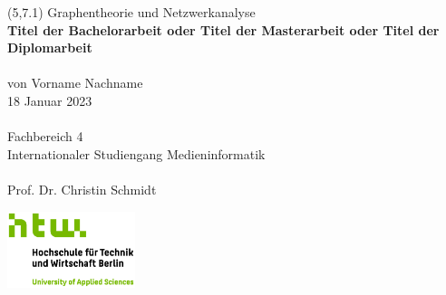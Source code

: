 \begin{titlepage}

\begingroup
\begin{textblock}{6}(5,7.1)
\setlength{\parindent}{0pt}
\fontsize{10pt}{1.1em}\selectfont
Graphentheorie und Netzwerkanalyse
\vspace{0.1cm}
\\
\LARGE
{\color{htwgreen}
\textbf{Titel der Bachelorarbeit oder Titel der Masterarbeit oder Titel der Diplomarbeit}
}\\\\
\fontsize{10pt}{1.1em}\selectfont
von Vorname Nachname\\
18 Januar 2023\\\\
Fachbereich 4\\
Internationaler Studiengang Medieninformatik\\\\
Prof. Dr. Christin Schmidt\\
\end{textblock}
\endgroup
     
\vfill
        
\begin{center}
\includegraphics[width=0.28\textwidth,keepaspectratio]{images/HTW_Logo_rgb.jpg}
\end{center}

\end{titlepage}